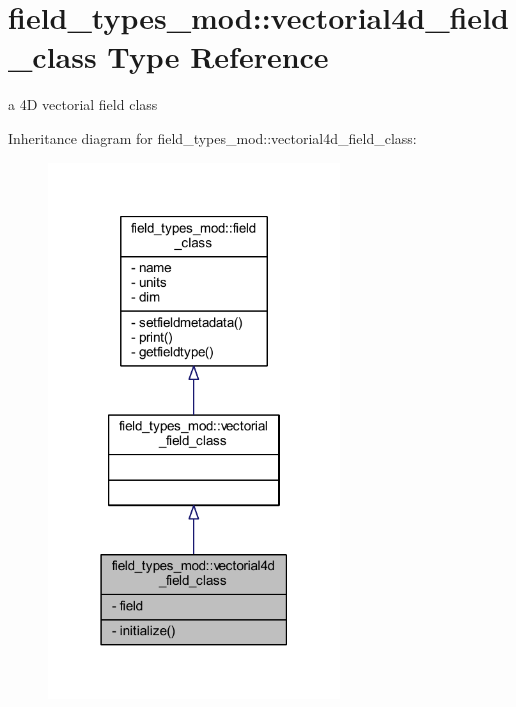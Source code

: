 \hypertarget{structfield__types__mod_1_1vectorial4d__field__class}{}\section{field\+\_\+types\+\_\+mod\+:\+:vectorial4d\+\_\+field\+\_\+class Type Reference}
\label{structfield__types__mod_1_1vectorial4d__field__class}


a 4D vectorial field class  




Inheritance diagram for field\+\_\+types\+\_\+mod\+:\+:vectorial4d\+\_\+field\+\_\+class\+:\nopagebreak
\begin{figure}[H]
\begin{center}
\leavevmode
\includegraphics[width=219pt]{structfield__types__mod_1_1vectorial4d__field__class__inherit__graph}
\end{center}
\end{figure}


